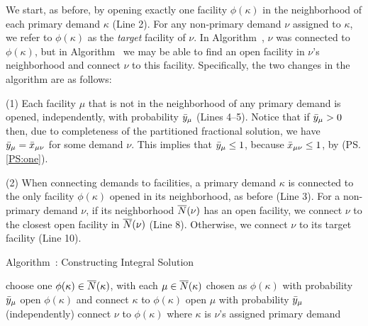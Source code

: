 \documentclass[oneside,final]{ucr}
\def\dsp{\def\baselinestretch{2.0}\large\normalsize}
\def\ssp{\def\baselinestretch{1.0}\large\normalsize}
\begin{document}
We start, as before, by opening exactly one facility $\phi(\kappa)$ in the 
neighborhood of each primary demand $\kappa$ (Line 2).  For any
non-primary demand $\nu$ assigned to $\kappa$, we refer to
$\phi(\kappa)$ as the \emph{target} facility of $\nu$.  In
Algorithm~{\EGUP}, $\nu$ was connected to $\phi(\kappa)$,
but in Algorithm~{\ECHS} we may be able to find an open
facility in $\nu$'s neighborhood and connect $\nu$ to this
facility.  Specifically, the two changes in the
algorithm are as follows:
%
\begin{description}
\item{(1)} Each facility $\mu$ that is not in the neighborhood of any
  primary demand is opened, independently, with probability
  ${\bar y}_{\mu}$ (Lines 4--5). Notice that if ${\bar y}_\mu>0$ then, due
  to completeness of the partitioned fractional solution, we have
  ${\bar y}_{\mu}= {\bar x}_{\mu\nu}$ for some demand $\nu$. This implies
  that ${\bar y}_{\mu}\leq 1$, because ${\bar x}_{\mu\nu}\le 1$, by
  (PS.\ref{PS:one}).
%
\item{(2)} When connecting demands to facilities, a primary demand
  $\kappa$ is connected to the only facility $\phi(\kappa)$ opened in
  its neighborhood, as before (Line 3).  For a non-primary demand
  $\nu$, if its neighborhood ${\overline{N}}(\nu)$ has an open facility, we
  connect $\nu$ to the closest open facility in ${\overline{N}}(\nu)$ (Line
  8). Otherwise, we connect $\nu$ to its target facility (Line 10).
%
\end{description}

\ssp
\begin{algorithm}
  \caption{Algorithm~{\ECHS}:
    Constructing Integral Solution}
  \label{alg:lpr3}
  \begin{algorithmic}[1]
    \State choose one $\phi(\kappa)\in {\overline{N}}(\kappa)$,
    with each $\mu\in{\overline{N}}(\kappa)$ chosen as $\phi(\kappa)$
    with probability ${\bar y}_\mu$ 
    \State open $\phi(\kappa)$ and connect $\kappa$ to $\phi(\kappa)$
    \EndFor
    \State open $\mu$ with probability ${\bar y}_\mu$ (independently)
    \EndFor
    \Else
    \State connect $\nu$ to $\phi(\kappa)$ where $\kappa$ is $\nu$'s
     assigned primary demand
    \EndIf
    \EndFor
  \end{algorithmic}
\end{algorithm}
\dsp
\end{document}
